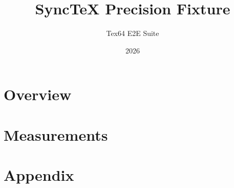 \documentclass{article}
\title{SyncTeX Precision Fixture}
\author{Tex64 E2E Suite}
\date{2026}
\begin{document}
\maketitle

\section{Overview}


\section{Measurements}


\section{Appendix}

\end{document}
